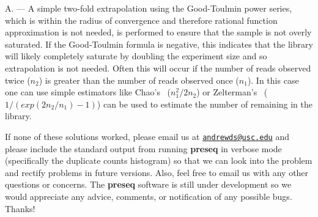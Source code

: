 \documentclass[11pt, titlepage]{article}
\newcounter{question}
\newcommand\Ans[1]{%
    \leavevmode\par\noindent
   {\leftskip37pt
    A. --- #1 \par }}
\begin{document}
\Ans{
A simple two-fold extrapolation using the Good-Toulmin
power series, which is within the radius of convergence and
therefore rational function approximation is not needed,
is performed to ensure that the sample is not overly saturated.
If the Good-Toulmin formula is negative, this indicates that the
library will likely completely saturate by doubling the experiment
size and so extrapolation is not needed.  Often this will occur
if the number of reads observed twice ($n_{2}$) is greater than the number
of reads observed once ($n_{1}$).  In this case one can use
simple estimators like Chao's~\cite{chao1987estimating} ($n_{1}^2 / 2 n_{2}$)
or Zelterman's~\cite{zelterman1988robust}
($1 / (exp(2 n_{2}/ n_{1}) - 1)$) can be used to estimate
the number of remaining in the library.
}

\vspace{5mm} If none of these solutions worked, please email us at
\href{mailto:andrewds@usc.edu}{\nolinkurl{andrewds@usc.edu}} and
please include the standard output from running \textbf{preseq} in
verbose mode (specifically the duplicate counts histogram) so that we
can look into the problem and rectify problems in future versions.
Also, feel free to email us with any other questions or concerns.  The
\textbf{preseq} software is still under development so we would
appreciate any advice, comments, or notification of any possible
bugs. Thanks!

\newpage



\end{document}
